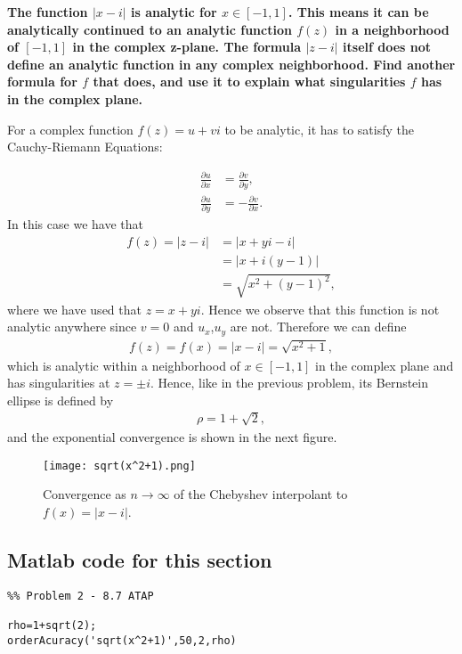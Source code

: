 \textbf{The function $|x-i|$  is analytic for $x\in[-1,1]$. This means it can be analytically continued to an analytic function $f(z)$ in a neighborhood of $[-1,1]$ in the complex z-plane. The formula $|z-i|$ itself does not define an analytic function in any complex neighborhood. Find another formula for $f$ that does, and use it to explain what singularities $f$ has in the complex plane.}
\newline

For a complex function $f(z) = u+vi$ to be analytic, it has to satisfy the Cauchy-Riemann Equations:

\begin{align*}
\frac{\partial u}{\partial x} &= \frac{\partial v}{\partial y},\\
\frac{\partial u}{\partial y} &= -\frac{\partial v}{\partial x}.
\end{align*}
In this case we have that
\begin{align*}
f(z) = |z-i| &= |x+yi-i| \\
&= |x+i(y-1)| \\
&= \sqrt{x^2+(y-1)^2},
\end{align*}
where we have used that $z=x+yi$. Hence we observe that this function is not analytic anywhere since $v=0$ and $u_x$,$u_y$ are not. Therefore we can define 
\begin{align*}
f(z) = f(x) = |x-i| = \sqrt{x^2+1},
\end{align*}
which is analytic within a neighborhood of $x\in [-1,1]$ in the complex plane and has singularities at $z=\pm i$. Hence, like in the previous problem, its Bernstein ellipse is defined by 
\begin{align*}
\rho = 1+\sqrt{2},
\end{align*}
and the exponential convergence is shown in the next figure.
\begin{figure}[H]
\centering
\texttt{[image: sqrt(x^2+1).png]}\caption{Convergence as $n\rightarrow\infty$ of the Chebyshev interpolant to $f(x)=|x-i|$.}
\end{figure}

\subsection*{Matlab code for this section}
\begin{verbatim}
%% Problem 2 - 8.7 ATAP

rho=1+sqrt(2);
orderAcuracy('sqrt(x^2+1)',50,2,rho)
\end{verbatim}